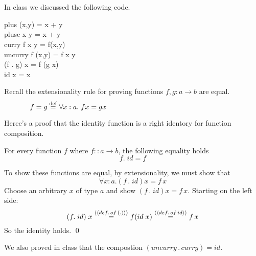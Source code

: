 \documentclass[11pt]{article}
\begin{document}

\section{}

\noindent{}In class we discussed the following code.

\begin{program**}
\>     plus (x,y) = x + y \\
\>     plusc x y = x + y \\
\>     curry f x y  =  f(x,y) \\
\>     uncurry f (x,y) = f x y \\
\>     (f . g) x = f (g x) \\
\>     id x = x \\
\end{program**}

\noindent{}Recall the extensionality rule for proving functions $f,g:a\rightarrow{}b$ are equal.
\[ f = g \;{\stackrel{\rm def}{=}}\; \forall{}x:a. \;f x = g x \hspace{2.5in} \]

Heree's a proof that the identity function is a right identory for function composition.

\begin{lemma}
For every function $f$ where $f::a \rightarrow b$, the following equality holds
\[ f .\; id = f\]
\end{lemma}
\Proof To show these functions are equal, by extensionality, we must show that
\[\forall{}x:a. (f\,.\;id)x = f\, x\]  Choose an arbitrary $x$ of type $a$ and show
$(f\,.\;id)x = f\, x$.  Starting on the left side:
\[(f.\; id)\;x \stackrel{\langle\langle{{def.\,of\,(.)}}\rangle\rangle}{=} f(id\; x) \stackrel{\langle\langle{{def.\,of\,id}}\rangle\rangle}{=} f \,x\]
So the identity holds.
\qed

We also proved in class that the compostion $(uncurry\,.\,curry) = id$.
\end{document}
